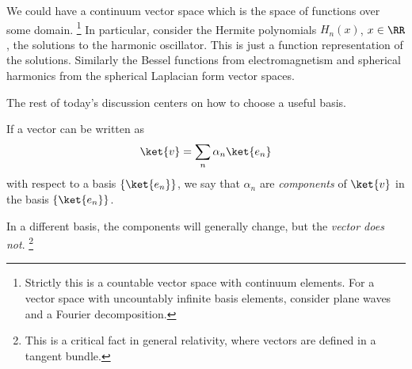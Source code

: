 \begin{exm}
    We could have a continuum vector space which is the space of functions over some domain.%
        \footnote{Strictly this is a countable vector space with continuum elements. For a vector space with uncountably infinite basis elements, consider plane waves and a Fourier decomposition.}
    In particular, consider the Hermite polynomials $H_n(x)$, $x\in \RR$, the solutions to the harmonic oscillator. This is just a function representation of the solutions. Similarly the Bessel functions from electromagnetism and spherical harmonics from the spherical Laplacian form vector spaces.
\end{exm}

The rest of today's discussion centers on how to choose a useful basis.

\begin{defn}
    If a vector can be written as
    \begin{equation}
        \ket{v}=\sum_n \alpha_n \ket{e_n}
    \end{equation}
    with respect to a basis $\set{\ket{e_n}}$, we say that $\alpha_n$ are \emph{components} of $\ket{v}$ in the basis $\set{\ket{e_n}}$.
\end{defn}
In a different basis, the components will generally change, but the \emph{vector does not}.%
    \footnote{This is a critical fact in general relativity, where vectors are defined in a tangent bundle.}

